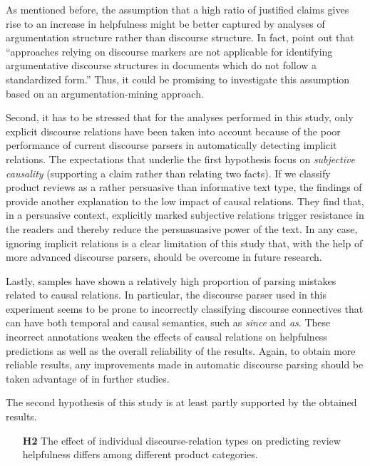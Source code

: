 \documentclass[
    a4paper,%
    12pt,%
    oneside,%
    toc=bibliography,
    final,
]{scrartcl}
\begin{document}
As mentioned before, the assumption that a high ratio of justified claims gives rise to an increase in helpfulness might be better captured by analyses of argumentation structure rather than discourse structure. In fact, \citet[54]{StabGurevych2014} point out that “approaches relying on discourse markers are not applicable for identifying argumentative discourse structures in documents which do not follow a standardized form.” Thus, it could be promising to investigate this assumption based on an argumentation-mining approach.

Second, it has to be stressed that for the analyses performed in this study, only explicit discourse relations have been taken into account because of the poor performance of current discourse parsers in automatically detecting implicit relations. The expectations that underlie the first hypothesis focus on \textit{subjective causality} (supporting a claim rather than relating two facts). If we classify product reviews as a rather persuasive than informative text type, the findings of \citet{Kamalski2008} provide another explanation to the low impact of causal relations. They find that, in a persuasive context, explicitly marked subjective relations trigger resistance in the readers and thereby reduce the persuasuasive power of the text. In any case, ignoring implicit relations is a clear limitation of this study that, with the help of more advanced discourse parsers, should be overcome in future research.

Lastly, samples have shown a relatively high proportion of parsing mistakes related to causal relations. In particular, the discourse parser used in this experiment seems to be prone to incorrectly classifying discourse connectives that can have both temporal and causal semantics, such as \textit{since} and \textit{as}. These incorrect annotations weaken the effects of causal relations on helpfulness predictions as well as the overall reliability of the results. Again, to obtain more reliable results, any improvements made in automatic discourse parsing should be taken advantage of in further studies.


The second hypothesis of this study is at least partly supported by the obtained results.

\begin{enumerate}[rightmargin=1cm]
\item[\textbf{H2}] The effect of individual discourse-relation types on predicting review helpfulness differs among different product categories.
\end{enumerate}
\end{document}
